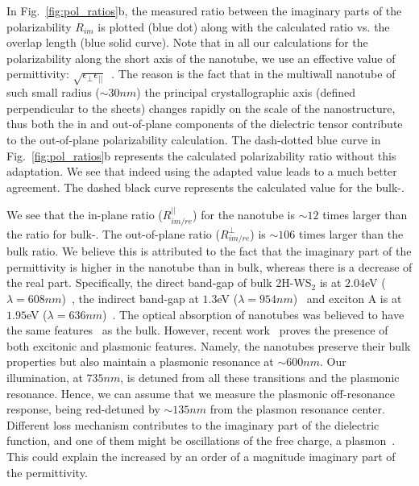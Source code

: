 \documentclass[journal=jacsat,manuscript=article]{achemso}
\begin{document}
In Fig.~\ref{fig:pol_ratios}b, the measured ratio between the imaginary parts of the polarizability $ R_{im}$ is plotted (blue dot) along with the calculated ratio vs. the overlap length (blue solid curve). Note that in all our calculations for the polarizability along the short axis of the nanotube, we use an effective value of permittivity: $\sqrt{\epsilon_{\perp}\epsilon_{||}}$~\cite{taverna2002,kociak2001experimental}. The reason is the fact that in the multiwall nanotube of such small radius ($\sim 30nm$) the principal crystallographic axis (defined perpendicular to the  sheets) changes rapidly on the scale of the nanostructure, thus both the in and out-of-plane components of the dielectric tensor contribute to the out-of-plane polarizability calculation. The dash-dotted blue curve in Fig.~\ref{fig:pol_ratios}b represents the calculated polarizability ratio without this adaptation. We see that indeed using the adapted value leads to a much better agreement. The dashed black curve represents the calculated value for the bulk-.

We see that the in-plane ratio ($R_{im/re}^{||}$) for the  nanotube is $\sim12$ times larger than the ratio for bulk-. The out-of-plane ratio ($R_{im/re}^{\perp}$) is $\sim106$ times larger than the bulk ratio. We believe this is attributed to the fact that the imaginary part of the permittivity is higher in the nanotube than in bulk, whereas there is a decrease of the real part. Specifically, the direct band-gap of bulk 2H-WS$_2$ is at $2.04$eV ($\lambda=608nm$)~\cite{wilson1969transition}, the indirect band-gap at $1.3$eV ($\lambda=954nm$)~\cite{ballif1999optical} and exciton A is at $1.95$eV ($\lambda=636nm$)~\cite{frey1998optical}. The optical absorption of nanotubes was believed to have the same features~\cite{frey1998optical} as the bulk. However, recent work~\cite{Yadgarov2016unique} proves the presence of both excitonic and plasmonic features. Namely, the nanotubes preserve their  bulk properties but also maintain a plasmonic resonance at $\sim 600nm$. Our illumination, at $735nm$, is detuned from all these transitions and the plasmonic resonance. Hence, we can assume that we measure the plasmonic off-resonance response, being red-detuned by $\sim135nm$ from the plasmon resonance center.
Different loss mechanism contributes to the imaginary part of the dielectric function, and one of them might be oscillations of the free charge, a plasmon~\cite{Yadgarov2016unique}. This could explain the increased by an order of a magnitude imaginary part of the permittivity.
\end{document}

